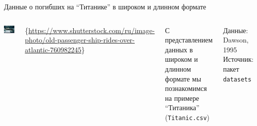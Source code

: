 \documentclass[
  10pt,
  ignorenonframetext,
  aspectratio=169,t,xcolor=table]{beamer}
\newcommand{\columnsbegin}{\vspace{-0.5\baselineskip}\begin{columns}[t,onlytextwidth]}
\newcommand{\columnsend}{\end{columns}}
\begin{document}
\begin{frame}[fragile]{Данные о погибших на ``Титанике'' \newline в
широком и длинном формате}
\protect\hypertarget{ux434ux430ux43dux43dux44bux435-ux43e-ux43fux43eux433ux438ux431ux448ux438ux445-ux43dux430-ux442ux438ux442ux430ux43dux438ux43aux435-ux432-ux448ux438ux440ux43eux43aux43eux43c-ux438-ux434ux43bux438ux43dux43dux43eux43c-ux444ux43eux440ux43cux430ux442ux435}{}
\columnsbegin
{}

\includegraphics[height=0.6\textheight,keepaspectratio]{./images/stock-photo-old-passenger-ship-rides-over-the-atlantic-760982245.jpg}

\tiny\{\url{https://www.shutterstock.com/ru/image-photo/old-passenger-ship-rides-over-atlantic-760982245}\}


С представлением данных в широком и длинном формате мы познакомимся на
примере ``Титаника'' (\texttt{Titanic.csv})

\vspace{\baselineskip}

Данные: Dawson, 1995 \newline Источник: пакет \texttt{datasets}

\columnsend
\end{frame}
\end{document}
